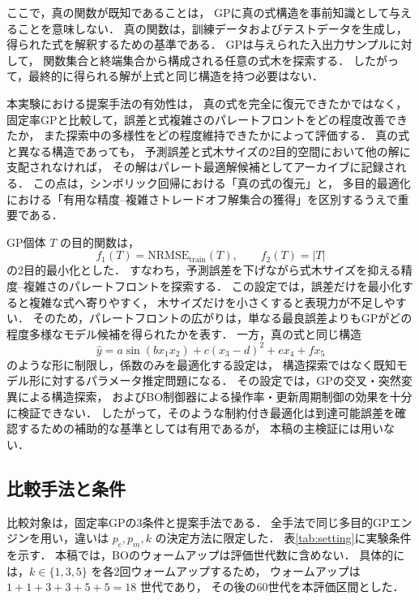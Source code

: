 \documentclass[a4paper,10pt,twocolumn]{ltjsarticle}
\newcommand{\NRMSE}{\mathrm{NRMSE}}
\begin{document}
ここで，真の関数が既知であることは，
GPに真の式構造を事前知識として与えることを意味しない．
真の関数は，訓練データおよびテストデータを生成し，
得られた式を解釈するための基準である．
GPは与えられた入出力サンプルに対して，
関数集合と終端集合から構成される任意の式木を探索する．
したがって，最終的に得られる解が上式と同じ構造を持つ必要はない．

本実験における提案手法の有効性は，
真の式を完全に復元できたかではなく，
固定率GPと比較して，誤差と式複雑さのパレートフロントをどの程度改善できたか，
また探索中の多様性をどの程度維持できたかによって評価する．
真の式と異なる構造であっても，
予測誤差と式木サイズの2目的空間において他の解に支配されなければ，
その解はパレート最適解候補としてアーカイブに記録される．
この点は，シンボリック回帰における「真の式の復元」と，
多目的最適化における「有用な精度--複雑さトレードオフ解集合の獲得」を区別するうえで重要である．

GP個体 \(T\) の目的関数は，
\begin{equation}
f_1(T)=\NRMSE_{\mathrm{train}}(T),
\qquad
f_2(T)=|T|
\end{equation}
の2目的最小化とした．
すなわち，予測誤差を下げながら式木サイズを抑える精度--複雑さのパレートフロントを探索する．
この設定では，誤差だけを最小化すると複雑な式へ寄りやすく，
木サイズだけを小さくすると表現力が不足しやすい．
そのため，パレートフロントの広がりは，単なる最良誤差よりもGPがどの程度多様なモデル候補を得られたかを表す．
一方，真の式と同じ構造
\[
\hat y
=a\sin(bx_1x_2)
+c(x_3-d)^2
+ex_4
+fx_5
\]
のような形に制限し，係数のみを最適化する設定は，
構造探索ではなく既知モデル形に対するパラメータ推定問題になる．
その設定では，GPの交叉・突然変異による構造探索，
およびBO制御器による操作率・更新周期制御の効果を十分に検証できない．
したがって，そのような制約付き最適化は到達可能誤差を確認するための補助的な基準としては有用であるが，
本稿の主検証には用いない．

\subsection{比較手法と条件}

比較対象は，固定率GPの3条件と提案手法である．
全手法で同じ多目的GPエンジンを用い，違いは \(p_c,p_m,k\) の決定方法に限定した．
表\ref{tab:setting}に実験条件を示す．
本稿では，BOのウォームアップは評価世代数に含めない．
具体的には，\(k\in\{1,3,5\}\) を各2回ウォームアップするため，
ウォームアップは \(1+1+3+3+5+5=18\) 世代であり，
その後の60世代を本評価区間とした．
\end{document}

